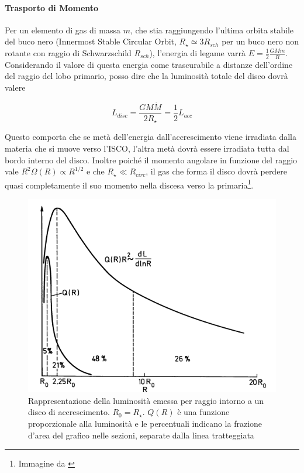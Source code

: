 \documentclass[a4paperbi]{article}
\begin{document}
	\paragraph{Trasporto di Momento} Per un elemento di gas di massa $m$, che stia raggiungendo l'ultima orbita stabile del buco nero (Innermost Stable Circular Orbit,  $R_{\star}\simeq 3R_{sch}$ per un buco nero non rotante con raggio di Schwarzschild $R_{sch}$), l'energia di legame varrà $E=\frac{1}{2}\frac{GMm}{R}$. Considerando il valore di questa energia come trascurabile a distanze dell'ordine del raggio del lobo primario, posso dire che la luminosità totale del disco dovrà valere
	
	\begin{equation}
		L_{disc}=\frac{GM\dot{M}}{2R_{\star}}=\frac{1}{2}L_{acc}
	\end{equation}

	Questo comporta che se metà dell'energia dall'accrescimento viene irradiata dalla materia che si muove verso l'ISCO, l'altra metà dovrà essere irradiata tutta dal bordo interno del disco. Inoltre poiché il momento angolare in funzione del raggio vale $R^2\Omega(R)\propto R^{1/2}$ e che $R_{\star}\ll R_{circ}$, il gas che forma il disco dovrà perdere quasi completamente il suo momento nella discesa verso la primaria\footnote{Immagine da \cite{ShakuraSunyaev1973}}.	

	\begin{figure}[H]
		\centering
		\includegraphics[width=0.7\linewidth]{LuminositaRaggio}
		\caption{Rappresentazione della luminosità emessa per raggio intorno a un disco di accrescimento. $R_0=R_\star$. $Q(R)$ è una funzione proporzionale alla luminosità e le percentuali indicano la frazione d'area del grafico nelle sezioni, separate dalla linea tratteggiata}
		\label{fig:LuminositaRaggio}
	\end{figure}
\end{document}
